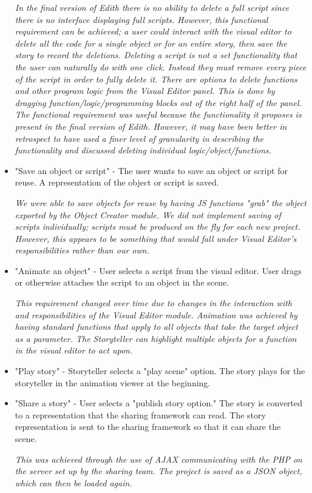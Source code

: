 \documentclass[12pt]{article}
\begin{document}
\begin{itemize}
\textit{In the final version of Edith there is no ability to delete a full script since there is no interface displaying full scripts. However, this functional requirement can be achieved; a user could interact with the visual editor to delete all the code for a single object or for an entire story, then save the story to record the deletions.  Deleting a script is not a set functionality that the user can naturally do with one click.  Instead they must remove every piece of the script in order to fully delete it. There are options to delete functions and other program logic from the Visual Editor panel. This is done by dragging function/logic/programming blocks out of the right half of the panel. The functional requirement was useful because the functionality it proposes is present in the final version of Edith. However, it may have been better in retrospect to have used a finer level of granularity in describing the functionality and discussed deleting individual logic/object/functions.}

\item "Save an object or script" - The user wants to save an object or script for reuse. A representation of the object or script is saved.\

\textit{We were able to save objects for reuse by having JS functions "grab" the object exported by the Object Creator module. We did not implement saving of scripts individually; scripts must be produced on the fly for each new project. However, this appears to be something that would fall under Visual Editor's responsibilities rather than our own.}

\item "Animate an object" -  User selects a script from the visual editor. User drags or otherwise attaches the script to an object in the scene.\

\textit{This requirement changed over time due to changes in the interaction with and responsibilities of the Visual Editor module. Animation was achieved by having standard functions that apply to all objects that take the target object as a parameter. The Storyteller can highlight multiple objects for a function in the visual editor to act upon.}

\item "Play story" - Storyteller selects a "play scene" option. The story plays for the storyteller in the animation viewer at the beginning.\

\item "Share a story" - User selects a "publish story option." The story is converted to a representation that the sharing framework can read. The story representation is sent to the sharing framework so that it can share the scene.\

\textit{This was achieved through the use of AJAX communicating with the PHP on the server set up by the sharing team. The project is saved as a JSON object, which can then be loaded again.}

\end{itemize}
\end{document}
